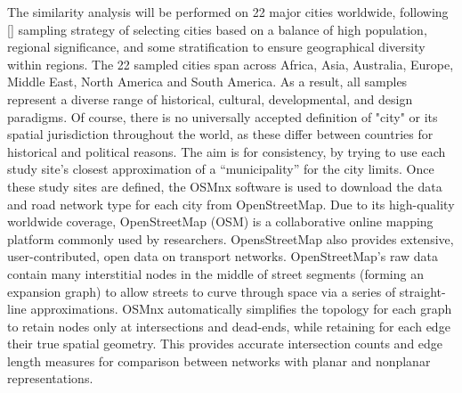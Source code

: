 The similarity analysis will be performed on 22 major cities worldwide, following [\cite{Louf:2014}] sampling strategy of selecting cities based on a balance of high population, regional significance, and some stratification to ensure geographical diversity within regions. The 22 sampled cities span across Africa, Asia, Australia, Europe, Middle East, North America and South America. As a result, all samples represent a diverse range of historical, cultural, developmental, and design paradigms. Of course, there is no universally accepted definition of "city" or its spatial jurisdiction throughout the world, as these differ between countries for historical and political reasons. The aim is for consistency, by trying to use each study site’s closest approximation of a “municipality” for the city limits. Once these study sites are defined, the OSMnx software is used to download the data and road network type for each city from OpenStreetMap. Due to its high-quality worldwide coverage, OpenStreetMap (OSM) is a collaborative online mapping platform commonly used by researchers. OpensStreetMap also provides extensive, user-contributed, open data on transport networks. OpenStreetMap’s raw data contain many interstitial nodes in the middle of street segments (forming an expansion graph) to allow streets to curve through space via a series of straight-line approximations. OSMnx automatically simplifies the topology for each graph to retain nodes only at intersections and dead-ends, while retaining for each edge their true spatial geometry. This provides accurate intersection counts and edge length measures for comparison between  networks with planar and nonplanar representations.

